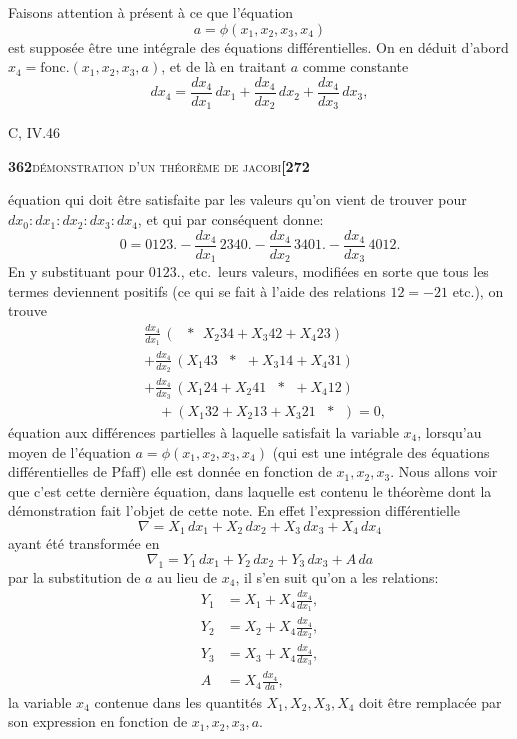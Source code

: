 \documentclass[11pt]{article}
\begin{document}
\medskip

Faisons attention \`a pr\'esent \`a ce que l'\'equation
\[
a = \phi(x_1, x_2, x_3, x_4)
\]
est suppos\'ee \^etre une int\'egrale des \'equations diff\'erentielles. On en d\'eduit d'abord $x_4 = \text{fonc.}(x_1, x_2, x_3, a)$, et de l\`a en traitant $a$ comme constante
\[
dx_4 = \frac{d x_4}{d x_1}\, dx_1 + \frac{d x_4}{d x_2}\, dx_2 + \frac{d x_4}{d x_3}\, dx_3,
\]

\hfill C, IV.\hfill 46

\newpage
\noindent\textbf{362}\hfill\textsc{d\'emonstration d'un th\'eor\`eme de jacobi}\hfill\textbf{[272}

\medskip

\noindent \'equation qui doit \^etre satisfaite par les valeurs qu'on vient de trouver pour $dx_0 : dx_1 : dx_2 : dx_3 : dx_4$, et qui par cons\'equent donne:
\[
0 = 0123. - \frac{dx_4}{dx_1}\, 2340. - \frac{dx_4}{dx_2}\, 3401. - \frac{dx_4}{dx_3}\, 4012.
\]
En y substituant pour $0123.$, etc.\ leurs valeurs, modifi\'ees en sorte que tous les termes deviennent positifs (ce qui se fait \`a l'aide des relations $12 = -21$ etc.), on trouve
\[
\begin{aligned}
& \frac{dx_4}{dx_1}\,(\ \ \ * \ \ X_2 34 + X_3 42 + X_4 23) \\
& + \frac{dx_4}{dx_2}\,(X_1 43 \ \ \ * \ \ + X_3 14 + X_4 31) \\
& + \frac{dx_4}{dx_3}\,(X_1 24 + X_2 41 \ \ \ * \ \ + X_4 12) \\
& \quad + (X_1 32 + X_2 13 + X_3 21\ \ \ * \ \ ) = 0,
\end{aligned}
\]
\'equation aux diff\'erences partielles \`a laquelle satisfait la variable $x_4$, lorsqu'au moyen de l'\'equation $a = \phi(x_1, x_2, x_3, x_4)$ (qui est une int\'egrale des \'equations diff\'erentielles de Pfaff) elle est donn\'ee en fonction de $x_1, x_2, x_3$. Nous allons voir que c'est cette derni\`ere \'equation, dans laquelle est contenu le th\'eor\`eme dont la d\'emonstration fait l'objet de cette note. En effet l'expression diff\'erentielle
\[
\nabla = X_1\, dx_1 + X_2\, dx_2 + X_3\, dx_3 + X_4\, dx_4
\]
ayant \'et\'e transform\'ee en
\[
\nabla_1 = Y_1\, dx_1 + Y_2\, dx_2 + Y_3\, dx_3 + A\, da
\]
par la substitution de $a$ au lieu de $x_4$, il s'en suit qu'on a les relations:
\[
\begin{aligned}
Y_1 &= X_1 + X_4 \frac{dx_4}{dx_1},\\
Y_2 &= X_2 + X_4 \frac{dx_4}{dx_2},\\
Y_3 &= X_3 + X_4 \frac{dx_4}{dx_3},\\
A &= X_4 \frac{dx_4}{da},
\end{aligned}
\]
la variable $x_4$ contenue dans les quantit\'es $X_1, X_2, X_3, X_4$ doit \^etre remplac\'ee par son expression en fonction de $x_1, x_2, x_3, a$.
\end{document}
